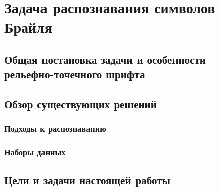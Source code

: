 \documentclass{main.tex}[subfiles]
\begin{document}
\section{Задача распознавания символов Брайля}
\subsection{Общая постановка задачи и особенности рельефно-точечного шрифта}
\subsection{Обзор существующих решений}
\subsubsection{Подходы к распознаванию}

\cite{baumgartner2020app}
\cite{li2020braunet}
\cite{ovodov2020}
\cite{ovodov2021}
\cite{alsalman2021}
\cite{ortoncelli2021}

\subsubsection{Наборы данных}

\subsection{Цели и задачи настоящей работы}
\end{document}
